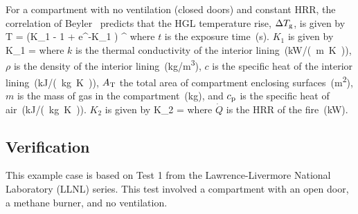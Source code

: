 For a compartment with no ventilation (closed doors) and constant HRR, the correlation of Beyler~\cite{SFPE:Walton} predicts that the HGL temperature rise, $\Delta T\sb{g}$, is given by
\be
\Delta T =  (K_1  - 1 + e^{-K_1 }) \quad ^
\label{eq:Beyler}
\ee
where $t$ is the exposure time~(\si{\second}). $K_1$ is given by
\be
K_1 = 
\label{eq:Beyler_K1}
\ee
where $k$ is the thermal conductivity of the interior lining~(\si{kW/(m.K)}), $\rho$ is the density of the interior lining~(\si{kg/m^3}), $c$ is the specific heat of the interior lining~(\si{kJ/(kg.K)}), $A\sb{T}$ the total area of compartment enclosing surfaces~(\si{m^2}), $m$ is the mass of gas in the compartment~(\si{kg}), and $c\sb{p}$ is the specific heat of air~(\si{kJ/(kg.K)}). $K_2$ is given by
\be
K_2 = 
\label{eq:Beyler_K2}
\ee
where $\dot Q$ is the HRR of the fire~(\si{kW}).


\clearpage


\subsection*{Verification}

This example case is based on Test 1 from the Lawrence-Livermore National Laboratory (LLNL) series. This test involved a compartment with an open door, a methane burner, and no ventilation.

